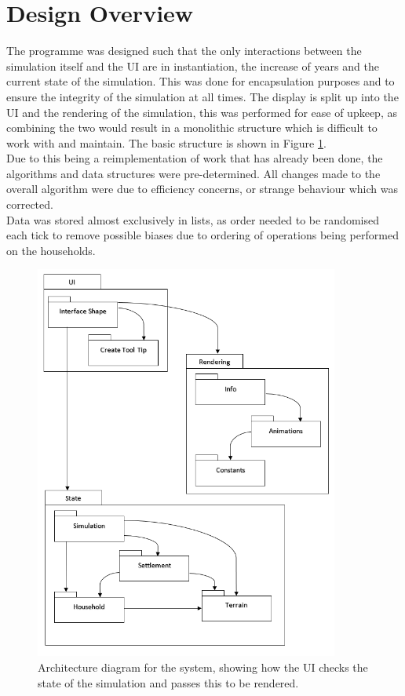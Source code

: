 \documentclass[12pt]{article}
\begin{document}
	\section{Design Overview}
		The programme was designed such that the only interactions between the simulation itself and the UI are in instantiation, the increase of years and the current state of the simulation. This was done for encapsulation purposes and to ensure the integrity of the simulation at all times. The display is split up into the UI and the rendering of the simulation, this was performed for ease of upkeep, as combining the two would result in a monolithic structure which is difficult to work with and maintain. The basic structure is shown in Figure \ref{fig:Architecture}.\\
		Due to this being a reimplementation of work that has already been done, the algorithms and data structures were pre-determined. All changes made to the overall algorithm were due to efficiency concerns, or strange behaviour which was corrected.\\
		Data was stored almost exclusively in lists, as order needed to be randomised each tick to remove possible biases due to ordering of operations being performed on the households.\\
		
		\begin{figure}[!htb]
		\includegraphics[width=10cm]{ArchitectureDiagram}
		\caption{Architecture diagram for the system, showing how the UI checks the state of the simulation and passes this to be rendered.}
		\label{fig:Architecture}
		\end{figure}
	
\end{document}
